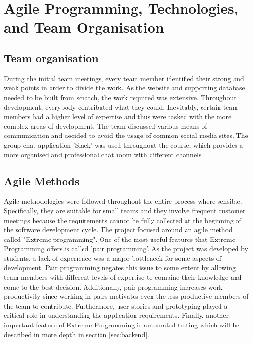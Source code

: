 \documentclass{l3proj}
\begin{document}
\section{Agile Programming, Technologies, and Team Organisation}

\subsection{Team organisation}
\label{sec:organisation}

During the initial team meetings, every team member identified their strong and weak points in order to divide the work. As the website and supporting database needed to be built from scratch, the work required was extensive. Throughout development, everybody contributed what they could. Inevitably, certain team members had a higher level of expertise and thus were tasked with the more complex areas of development. The team discussed various means of communication and decided to avoid the usage of common social media sites. The group-chat application 'Slack' was used throughout the course, which provides a more organised and professional chat room with different channels.

\subsection{Agile Methods}
\label{sec:agile}

Agile methodologies were followed throughout the entire process where sensible. Specifically, they are suitable for small teams and they involve frequent customer meetings because the requirements cannot be fully collected at the beginning of the software development cycle. The project focused around an agile method called "Extreme programming". One of the most useful features that Extreme Programming offers is called 'pair programming'. As the project was developed by students, a lack of experience was a major bottleneck for some aspects of development. Pair programming negates this issue to some extent by allowing team members with different levels of expertise to combine their knowledge and come to the best decision. Additionally, pair programming increases work productivity since working in pairs motivates even the less productive members of the team to contribute. Furthermore, user stories and prototyping played a critical role in understanding the application requirements. Finally, another important feature of Extreme Programming is automated testing which will be described in more depth in section \ref{sec:backend}.
\end{document}
